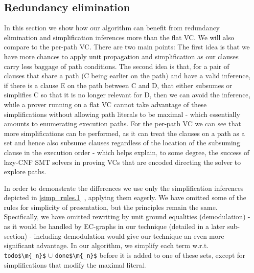 \subsection{Redundancy elimination}
In this section we show how our algorithm can benefit from redundancy elimination and simplification inferences more than the flat VC.
We will also compare to the per-path VC. 
There are two main points:
The first idea is that we have more chances to apply unit propagation and simplification as our clauses carry less baggage of path conditions.
The second idea is that, for a pair of clauses  that share a path (C being earlier on the path) and have a valid inference, 
if there is a clause E on the path between C and D, that either subsumes or simplifies C so that it is no longer relevant for D, then we can avoid the inference, while a prover running on a flat VC cannot take advantage of these simplifications without allowing path literals to be maximal - which essentially amounts to enumerating execution paths. For the per-path VC we can see that more simplifications can be performed, as it can treat the clauses on a path as a set and hence also subsume clauses regardless of the location of the subsuming clause in the execution order - which helps explain, to some degree, the success of lazy-CNF SMT solvers in proving VCs that are encoded directing the solver to explore paths.


In order to demonstrate the differences we use only the simplification inferences depicted in \ref{simp_rules.1} , applying them eagerly.
We have omitted some of the rules for simplicity of presentation, but the principles remain the same.
Specifically, we have omitted rewriting by unit ground equalities (demodulation) - as it would be handled by EC-graphs in our technique (detailed in a later sub-section) - 
including demodulation would give our technique an even more significant advantage.
In our algorithm, we simplify each term w.r.t. \lstinline|todo$\m{_n}$| $\cup$ \lstinline|done$\m{_n}$| before it is added to one of these sets,
except for simplifications that modify the maximal literal.

